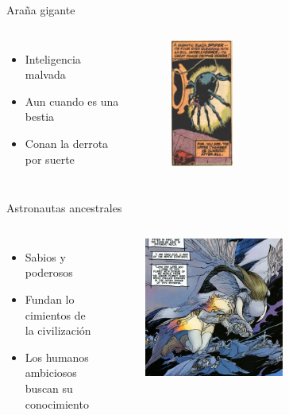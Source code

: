 \begin{frame}{Araña gigante}
  \begin{columns}
    \begin{itemize}
      \item Inteligencia malvada
      \item Aun cuando es una bestia
      \item Conan la derrota por suerte
    \end{itemize}
    \begin{figure}[htb]
      \centering
      \includegraphics[width=0.3\textwidth]{img/tropes/arana}
    \end{figure} 
  \end{columns} 
\end{frame}

\begin{frame}{Astronautas ancestrales}
\begin{columns}
 \begin{itemize}
    \item Sabios y poderosos
    \item Fundan lo cimientos de la civilización
    \item Los humanos ambiciosos buscan su conocimiento
 \end{itemize}
    \begin{figure}[htb]
      \centering
      \includegraphics[width=0.6\textwidth]{img/tropes/astronautas}
    \end{figure} 
  \end{columns} 
\end{frame}

